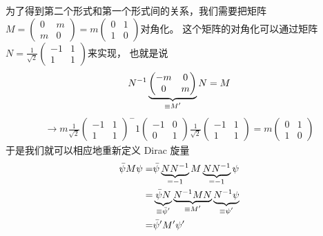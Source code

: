 为了得到第二个形式和第一个形式间的关系，我们需要把矩阵$M=\begin{pmatrix}0&m\\m&0\end{pmatrix}=m\begin{pmatrix}0&1\\1&0\end{pmatrix}$对角化。
这个矩阵的对角化可以通过矩阵$N=\frac{1}{\sqrt{2}}\begin{pmatrix}-1&1\\1&1\end{pmatrix}$来实现，
也就是说
\begin{align}
  N^{-1}\underbrace{\begin{pmatrix}-m&0\\0&m\end{pmatrix}}_{\mathclap{\equiv M'}}N=M
\end{align}
\begin{align}
  \rightarrow m\frac{1}{\sqrt{2}}\begin{pmatrix}-1&1\\1&1\end{pmatrix}^-1\begin{pmatrix}-1&0\\0&1\end{pmatrix}\frac{1}{\sqrt{2}}
  \begin{pmatrix}-1&1\\1&1\end{pmatrix}=m\begin{pmatrix}0&1\\1&0\end{pmatrix}
\end{align}
于是我们就可以相应地重新定义 Dirac 旋量
\begin{align}
\begin{split}
  \bar{\psi}M\psi=&\bar{\psi}\underbrace{NN^{-1}}_{\mathclap{=-1}}M\underbrace{NN^{-1}}_{\mathclap{=-1}}\psi\\
  =&\underbrace{\bar{\psi}N}_{\mathclap{\equiv\bar{\psi}'}}
  \underbrace{N^{-1}MN}_{\mathclap{\equiv M'}}\underbrace{N^{-1}\psi}_{\mathclap{\equiv\psi'}}\\
  =&\bar{\psi}'M'\psi'
  \end{split}
\end{align}

